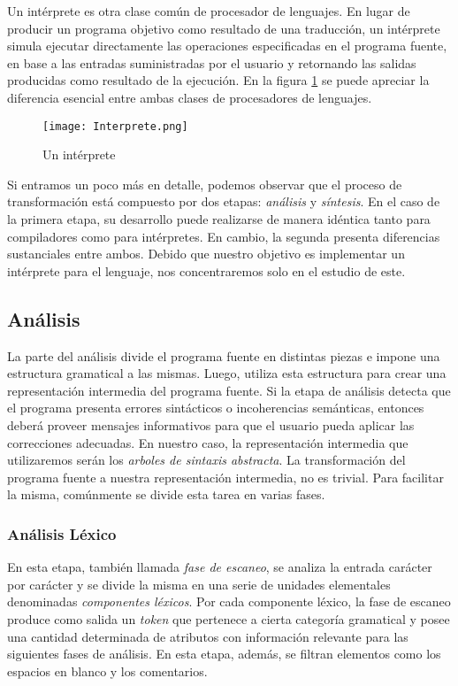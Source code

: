 Un intérprete es otra clase común de procesador de lenguajes.
En lugar de producir un programa objetivo como resultado de una traducción, un intérprete simula ejecutar directamente las operaciones especificadas en el programa fuente, en base a las entradas suministradas por el usuario y retornando las salidas producidas como resultado de la ejecución.
En la figura \ref{Intérprete} se puede apreciar la diferencia esencial entre ambas clases de procesadores de lenguajes.

\begin{figure}[h]
\centering
\texttt{[image: Interprete.png]}
\caption{Un intérprete}
\label{Intérprete}
\end{figure}

Si entramos un poco más en detalle, podemos observar que el proceso de transformación está compuesto por dos etapas: \textit{análisis} y \textit{síntesis}.
En el caso de la primera etapa, su desarrollo puede realizarse de manera idéntica tanto para compiladores como para intérpretes.
En cambio, la segunda presenta diferencias sustanciales entre ambos.
Debido que nuestro objetivo es implementar un intérprete para el lenguaje, nos concentraremos solo en el estudio de este.

\subsection{Análisis}

La parte del análisis divide el programa fuente en distintas piezas e impone una estructura gramatical a las mismas.
Luego, utiliza esta estructura para crear una representación intermedia del programa fuente.
Si la etapa de análisis detecta que el programa presenta errores sintácticos o incoherencias semánticas, entonces deberá proveer mensajes informativos para que el usuario pueda aplicar las correcciones adecuadas.
En nuestro caso, la representación intermedia que utilizaremos serán los \textit{arboles de sintaxis abstracta}.
La transformación del programa fuente a nuestra representación intermedia, no es trivial.
Para facilitar la misma, comúnmente se divide esta tarea en varias fases.

\subsubsection{Análisis Léxico}

En esta etapa, también llamada \textit{fase de escaneo}, se analiza la entrada carácter por carácter y se divide la misma en una serie de unidades elementales denominadas \textit{componentes léxicos}.
Por cada componente léxico, la fase de escaneo produce como salida un \textit{token} que pertenece a cierta categoría gramatical y posee una cantidad determinada de atributos con información relevante para las siguientes fases de análisis.
En esta etapa, además, se filtran elementos como los espacios en blanco y los comentarios.

